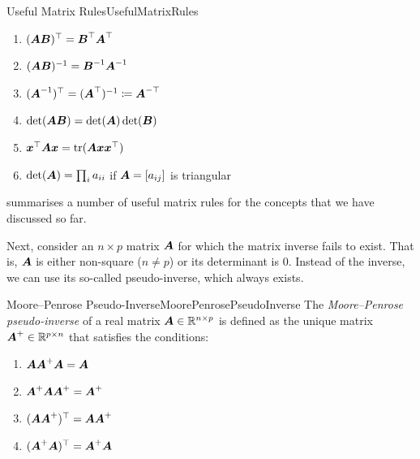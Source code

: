 \begin{thm}{Useful Matrix Rules}{UsefulMatrixRules}
	\begin{enumerate}
		\item \((\boldsymbol{AB})^\top = \boldsymbol{B}^\top \boldsymbol{A}^\top\)
		\item \((\boldsymbol{AB})^{-1} = \boldsymbol{B}^{-1} \boldsymbol{A}^{-1}\)
		\item \((\boldsymbol{A}^{-1})^\top = (\boldsymbol{A}^\top)^{-1} \coloneqq \boldsymbol{A}^{-\top}\)
		\item \(\det(\boldsymbol{AB}) = \det(\boldsymbol{A}) \det(\boldsymbol{B})\)
		\item \(\boldsymbol{x}^\top \boldsymbol{A} \boldsymbol{x} = \mathrm{tr}(\boldsymbol{A} \boldsymbol{x} \boldsymbol{x}^\top)\)
		\item \(\det(\boldsymbol{A}) = \prod_i a_{ii}\) if \(\boldsymbol{A} = [a_{ij}]\) is triangular
	\end{enumerate}
\end{thm}

 summarises a number of useful matrix rules for the concepts that we have discussed so far.

Next, consider an \(n \times p\) matrix \(\boldsymbol{A}\) for which the matrix inverse fails to exist. That is, \(\boldsymbol{A}\) is either non-square (\(n \neq p\)) or its determinant is 0. Instead of the inverse, we can use its so-called pseudo-inverse, which always exists.

\begin{defn}{Moore--Penrose Pseudo-Inverse}{MoorePenrosePseudoInverse}
	The \textit{Moore--Penrose pseudo-inverse} of a real matrix \(\boldsymbol{A} \in \mathbb{R}^{n \times p}\) is defined as the unique matrix \(\boldsymbol{A}^+ \in \mathbb{R}^{p \times n}\) that satisfies the conditions:
	\begin{enumerate}
		\item \(\boldsymbol{A} \boldsymbol{A}^+ \boldsymbol{A} = \boldsymbol{A}\)
		\item \(\boldsymbol{A}^+ \boldsymbol{A} \boldsymbol{A}^+ = \boldsymbol{A}^+\)
		\item \((\boldsymbol{A} \boldsymbol{A}^+)^\top = \boldsymbol{A} \boldsymbol{A}^+\)
		\item \((\boldsymbol{A}^+ \boldsymbol{A})^\top = \boldsymbol{A}^+ \boldsymbol{A}\)
	\end{enumerate}
\end{defn}

